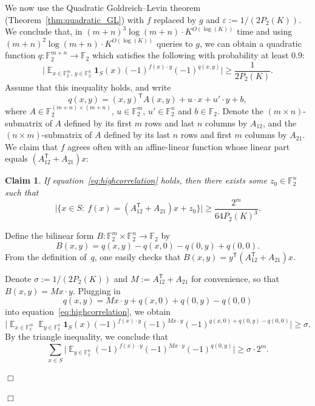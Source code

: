 \documentclass[11pt]{amsart}
\newcommand{\Exp}{\mathop{\mathbb{E}}}
\newcommand{\F}{\mathbb{F}} %
\newcommand{\one}{\mathbf{1}}
\newcommand{\tp}{\mathsf{T}}
\theoremstyle{plain}
\newtheorem{claim}[theorem]{Claim}
\theoremstyle{definition}
\theoremstyle{remark}
\renewenvironment{proof}[1][]{
    	\begin{trivlist}
     	\item[\hspace{\labelsep}{\em\noindent Proof#1:\/}]}
     	{{\hfill$\Box$}
    	\end{trivlist}
  }
\begin{document}
\begin{proof}
We now use the Quadratic Goldreich--Levin theorem (Theorem~\ref{thm:quadratic_GL}) with $f$ replaced by $g$ and $\varepsilon := 1/(2P_2(K))$.
We conclude that, in $(m+n)^3 \log(m+n) \cdot K^{O(\log(K))}$ time and using $(m+n)^2 \log(m+n) \cdot K^{O(\log(K))}$ queries to $g$, we can obtain a quadratic function $q: \F_2^{m+n} \rightarrow \F_2$ which satisfies the following with probability at least $0.9$:
\begin{equation}
\label{eq:highcorrelation}
    \Big|\Exp_{x\in \F_2^m,\, y\in \F_2^n} \one_S(x) (-1)^{f(x)\cdot y} (-1)^{q(x,y)}\Big| \geq \frac{1}{2 P_2(K)}.
\end{equation}
Assume that this inequality holds, and write
$$q(x, y) = (x,y)^\tp A (x,y) + u\cdot x + u'\cdot y + b,$$
where $A \in \F_2^{(m+n) \times (m+n)}$, $u\in \F_2^m$, $u'\in \F_2^n$ and $b\in \F_2$.
Denote the $(m\times n)$-submatrix of $A$ defined by its first $m$ rows and last $n$ columns by $A_{12}$, and the $(n\times m)$-submatrix of $A$ defined by its last $n$ rows and first $m$ columns by $A_{21}$.
We claim that $f$ agrees often with an affine-linear function whose linear part equals $(A_{12}^\tp + A_{21}) x$:

\begin{claim}
    If equation~\eqref{eq:highcorrelation} holds, then there exists some $z_0\in \F_2^n$ such that
    \begin{equation}
    \label{eq:interim_agreement_funcs}
    \big|\big\{x\in S:\: f(x) = (A_{12}^\tp + A_{21}) x + z_0\big\}\big| \geq \frac{2^m}{64 P_2(K)^3}.
\end{equation}
\end{claim}

\begin{proof}
Define the bilinear form $B: \F_2^m \times \F_2^n \to \F_2$ by
$$B(x,y) = q(x, y) - q(x, 0) - q(0, y) + q(0, 0).$$
From the definition of~$q$, one easily checks that $B(x,y) = y^\tp (A_{12}^\tp + A_{21}) x$.

Denote $\sigma := 1/(2 P_2(K))$ and $M := A_{12}^\tp + A_{21}$ for convenience, so that $B(x,y) = Mx \cdot y$.
Plugging in
$$q(x,y) = Mx\cdot y + q(x,0) + q(0,y) - q(0,0)$$
into  equation~\eqref{eq:highcorrelation}, we obtain
$$\Big|\Exp_{x\in \F_2^m} \Exp_{y\in \F_2^n} \one_S(x) (-1)^{f(x)\cdot y} (-1)^{Mx\cdot y} (-1)^{q(x,0) + q(0,y) - q(0,0)}\Big| \geq \sigma.$$
By the triangle inequality, we conclude that
\begin{equation*}
\sum_{x \in S} \Big| \Exp_{y \in \mathbb{F}_2^n} (-1)^{f(x)\cdot y} (-1)^{Mx\cdot y} (-1)^{q(0,y)} \Big| \geq \sigma\cdot 2^m.
\end{equation*}



\end{proof}
\end{proof}
\end{document}
